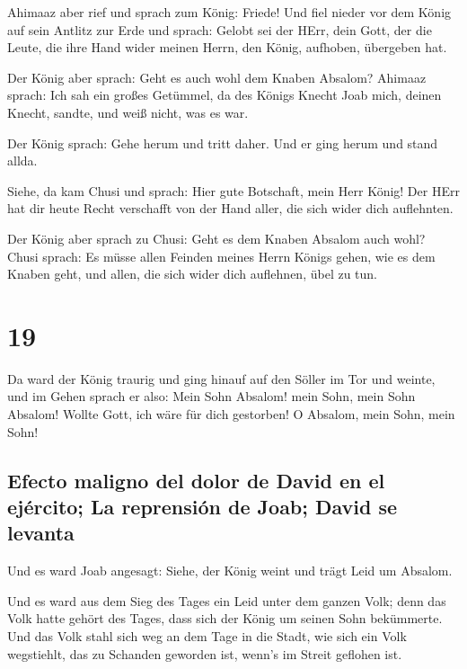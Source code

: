  Ahimaaz aber rief und sprach zum König: Friede! Und fiel
nieder vor dem König auf sein Antlitz zur Erde und sprach: Gelobt sei
der HErr, dein Gott, der die Leute, die ihre Hand wider meinen Herrn,
den König, aufhoben, übergeben hat.

 Der König aber sprach: Geht es auch wohl dem Knaben
Absalom? Ahimaaz sprach: Ich sah ein großes Getümmel, da des Königs
Knecht Joab mich, deinen Knecht, sandte, und weiß nicht, was es war.

 Der König sprach: Gehe herum und tritt daher. Und er
ging herum und stand allda.

 Siehe, da kam Chusi und sprach: Hier gute Botschaft,
mein Herr König! Der HErr hat dir heute Recht verschafft von der Hand
aller, die sich wider dich auflehnten.

 Der König aber sprach zu Chusi: Geht es dem Knaben
Absalom auch wohl? Chusi sprach: Es müsse allen Feinden meines Herrn
Königs gehen, wie es dem Knaben geht, und allen, die sich wider dich
auflehnen, übel zu tun.

\hypertarget{section-18}{%
\section{19}\label{section-18}}

 Da ward der König traurig und ging hinauf auf den Söller
im Tor und weinte, und im Gehen sprach er also: Mein Sohn Absalom! mein
Sohn, mein Sohn Absalom! Wollte Gott, ich wäre für dich gestorben! O
Absalom, mein Sohn, mein Sohn!

\hypertarget{efecto-maligno-del-dolor-de-david-en-el-ejuxe9rcito-la-reprensiuxf3n-de-joab-david-se-levanta}{%
\subsection{Efecto maligno del dolor de David en el ejército; La
reprensión de Joab; David se
levanta}\label{efecto-maligno-del-dolor-de-david-en-el-ejuxe9rcito-la-reprensiuxf3n-de-joab-david-se-levanta}}

 Und es ward Joab angesagt: Siehe, der König weint und
trägt Leid um Absalom.

 Und es ward aus dem Sieg des Tages ein Leid unter dem
ganzen Volk; denn das Volk hatte gehört des Tages, dass sich der König
um seinen Sohn bekümmerte.  Und das Volk stahl sich weg an
dem Tage in die Stadt, wie sich ein Volk wegstiehlt, das zu Schanden
geworden ist, wenn's im Streit geflohen ist.

